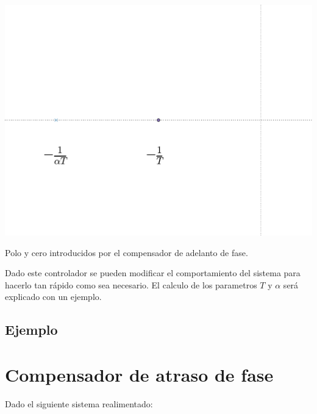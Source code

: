         \begin{marginfigure}
            \centering
            \includegraphics[width=\textwidth]{./imagenes/adelantopoloycero.pdf}
            \caption{\label{fig:adelantopoloycero}Polo y cero introducidos por el compensador de adelanto de fase.}
        \end{marginfigure}

        Dado este controlador se pueden modificar el comportamiento del sistema para hacerlo tan rápido como sea necesario. El calculo de los parametros $T$ y $\alpha$ será explicado con un ejemplo.


        \subsection{Ejemplo}


    \newpage
    \section{Compensador de atraso de fase}

        Dado el siguiente sistema realimentado:

